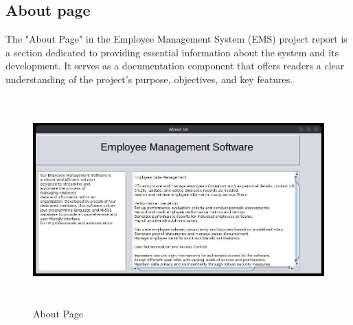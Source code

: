 \subsection{About page}
The "About Page" in the Employee Management System (EMS) project report is a section
dedicated to providing essential information about the system and its development. It serves as
a documentation component that offers readers a clear understanding of the project's purpose,
objectives, and key features.
\begin{figure}[h]
    \centering
    \includegraphics[height=8cm]{img/appsimg/about.png}
    \caption{About Page}
    \label{fig:about}
\end{figure}
